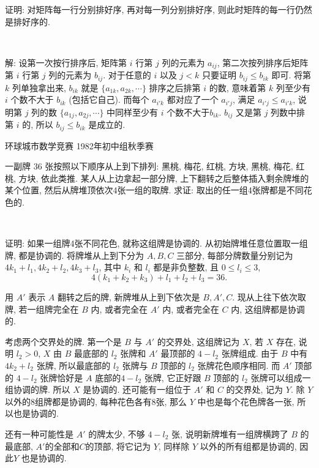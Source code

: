 \newpage

证明: 对矩阵每一行分别排好序, 再对每一列分别排好序, 则此时矩阵的每一行仍然是排好序的.

~

解: 设第一次按行排序后, 矩阵第 $i$ 行第 $j$ 列的元素为 $a_{ij}$, 第二次按列排序后矩阵第 $i$ 行第 $j$ 列的元素为 $b_{ij}$. 对于任意的 $i$ 以及 $j<k$ 只要证明 $b_{ij} \le b_{ik}$ 即可. 将第 $k$ 列单独拿出来, $b_{ik}$ 就是 $\{a_{1k}, a_{2k}, \cdots\}$ 排序之后排第 $i$ 的数, 意味着第 $k$ 列至少有 $i$ 个数不大于 $b_{ik}$ (包括它自己). 而每个 $a_{i'k}$ 都对应了一个 $a_{i'j}$, 满足 $a_{i'j} \le a_{i'k}$, 说明第 $j$ 列的数 $\{a_{1j}, a_{2j}, \cdots\}$ 中同样至少有 $i$ 个数不大于$b_{ik}$. $b_{ij}$ 又是第 $j$ 列数中排第 $i$ 的, 所以 $b_{ij} \le b_{ik}$ 是成立的.



\newpage

\noindent 环球城市数学竞赛 1982年初中组秋季赛

一副牌 36 张按照以下顺序从上到下排列: 黑桃, 梅花, 红桃, 方块, 黑桃, 梅花, 红桃, 方块, 依此类推. 某人从上边拿起一部分牌, 上下翻转之后整体插入剩余牌堆的某个位置, 然后从牌堆顶依次4张一组的取牌. 求证: 取出的任一组4张牌都是不同花色的.

~

证明: 如果一组牌4张不同花色, 就称这组牌是协调的. 从初始牌堆任意位置取一组牌, 都是协调的. 将牌堆从上到下分为 $A,B,C$ 三部分, 每部分牌数量分别记为 $4k_1+l_1, 4k_2+l_2, 4k_3+l_3$, 其中 $k_i$ 和 $l_i$ 都是非负整数, 且 $0\le l_i \le 3$, 
\[4(k_1+k_2+k_3) + l_1+l_2+l_3 = 36 .\]

用 $A'$ 表示 $A$ 翻转之后的牌, 新牌堆从上到下依次是 $B, A', C$. 现从上往下依次取牌, 若一组牌完全在 $B$ 内, 或者完全在 $A'$ 内, 或者完全在 $C$ 内, 这组牌都是协调的. 

考虑两个交界处的牌. 第一个是 $B$ 与 $A'$ 的交界处, 这组牌记为 $X$, 若 $X$ 存在, 说明 $l_2 > 0$, $X$ 由 $B$ 最底部的 $l_2$ 张牌和 $A'$ 最顶部的 $4-l_2$ 张牌组成. 由于 $B$ 中有 $4k_2+l_2$ 张牌, 所以最底部的 $l_2$ 张牌与 $B$ 顶部的 $l_2$ 张牌花色顺序相同. 而 $A'$ 顶部的 $4-l_2$ 张牌恰好是 $A$ 底部的$4-l_2$ 张牌, 它正好跟 $B$ 顶部的 $l_2$ 张牌可以组成一组协调的牌. 所以 $X$ 是协调的. 还可能有一组位于 $A'$ 和 $C$ 的交界处, 记为 $Y$. 除 $Y$ 以外的8组牌都是协调的, 每种花色各有8张, 那么 $Y$ 中也是每个花色牌各一张, 所以也是协调的.

还有一种可能性是 $A'$ 的牌太少, 不够 $4-l_2$ 张, 说明新牌堆有一组牌横跨了 $B$ 的最底部, $A'$的全部和$C$的顶部, 将它记为 $Y$, 同样除 $Y$ 以外的所有组都是协调的, 因此$Y$ 也是协调的.


